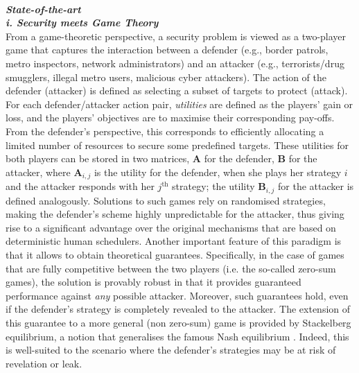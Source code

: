  

 

\noindent \textbf{\textit{\\State-of-the-art}}
\noindent \textbf{\textit{\\i. Security meets Game Theory }}\\
From a game-theoretic perspective, a security problem is viewed as a two-player game that captures the interaction between a defender (e.g., border patrols, metro inspectors, network administrators) and an attacker (e.g., terrorists/drug smugglers, illegal metro users, malicious cyber attackers). The action of the defender (attacker) is defined as selecting a subset of targets to protect (attack). For each defender/attacker action pair, \textit{utilities} are defined as the players' gain or loss, and the players' objectives are to maximise their corresponding pay-offs. From the defender's perspective, this corresponds to efficiently allocating a limited number of resources to secure some predefined targets. These utilities for both players can be stored in two  matrices,  $\boldsymbol A$ for the defender,  $\boldsymbol B$ for the attacker, where $\boldsymbol A_{i,j}$ is the utility for the defender, when she plays her strategy $i$ and the attacker responds with her $j^{\text{th}}$ strategy; the utility $\boldsymbol B_{i,j}$ for the attacker is defined analogously. 
Solutions to such games rely on randomised strategies, making the defender's scheme highly unpredictable for the attacker, thus giving rise to a significant advantage over the original mechanisms that are based on deterministic human schedulers. 
Another important feature of this paradigm is that it allows to obtain theoretical guarantees. Specifically, in the case of games that are fully competitive between the two players  (i.e. the so-called zero-sum games), the solution is provably robust in that it provides guaranteed performance against {\em any} possible attacker. Moreover, such guarantees hold, even if the defender's strategy is completely revealed to the attacker.  
The extension of this guarantee to a more general (non zero-sum) game is provided by Stackelberg equilibrium, a notion that generalises the famous Nash equilibrium \cite{korzhyk2011stackelberg}. Indeed, this is well-suited to the scenario where the defender's strategies may be at risk of revelation or leak. 


